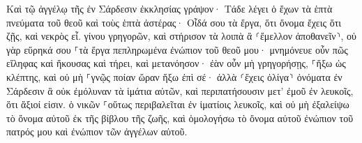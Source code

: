 \documentclass{openreader}
\begin{document}
Καὶ τῷ ἀγγέλῳ τῆς ἐν Σάρδεσιν ἐκκλησίας γράψον· Τάδε λέγει ὁ ἔχων τὰ ἑπτὰ πνεύματα τοῦ θεοῦ καὶ τοὺς ἑπτὰ ἀστέρας· Οἶδά σου τὰ ἔργα, ὅτι ὄνομα ἔχεις ὅτι ζῇς, καὶ νεκρὸς εἶ. 
γίνου γρηγορῶν, καὶ στήρισον τὰ λοιπὰ ἃ ⸂ἔμελλον ἀποθανεῖν⸃, οὐ γὰρ εὕρηκά σου ⸀τὰ ἔργα πεπληρωμένα ἐνώπιον τοῦ θεοῦ μου· 
μνημόνευε οὖν πῶς εἴληφας καὶ ἤκουσας καὶ τήρει, καὶ μετανόησον· ἐὰν οὖν μὴ γρηγορήσῃς, ⸀ἥξω ὡς κλέπτης, καὶ οὐ μὴ ⸀γνῷς ποίαν ὥραν ἥξω ἐπὶ σέ· 
ἀλλὰ ⸂ἔχεις ὀλίγα⸃ ὀνόματα ἐν Σάρδεσιν ἃ οὐκ ἐμόλυναν τὰ ἱμάτια αὐτῶν, καὶ περιπατήσουσιν μετ’ ἐμοῦ ἐν λευκοῖς, ὅτι ἄξιοί εἰσιν. 
ὁ νικῶν ⸀οὕτως περιβαλεῖται ἐν ἱματίοις λευκοῖς, καὶ οὐ μὴ ἐξαλείψω τὸ ὄνομα αὐτοῦ ἐκ τῆς βίβλου τῆς ζωῆς, καὶ ὁμολογήσω τὸ ὄνομα αὐτοῦ ἐνώπιον τοῦ πατρός μου καὶ ἐνώπιον τῶν ἀγγέλων αὐτοῦ. 
\end{document}
